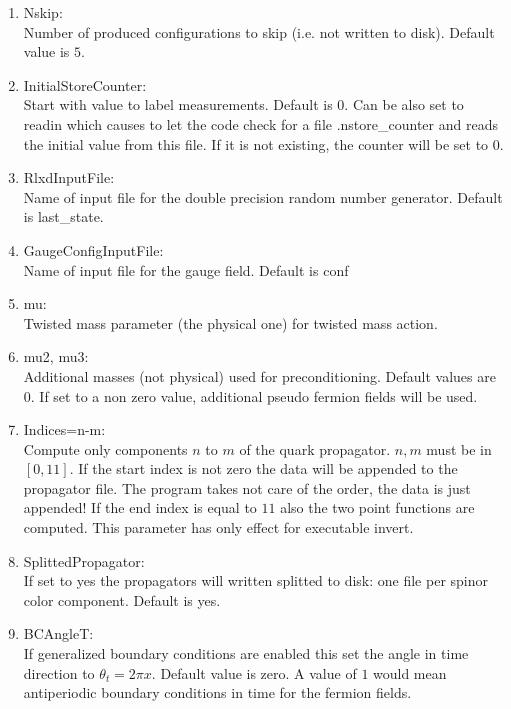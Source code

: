 \begin{enumerate}
\item {\ttfamily Nskip}:\\
  Number of produced configurations to skip (i.e. not written to
  disk). Default value is $5$. 

\item {\ttfamily InitialStoreCounter}:\\
  Start with value to label measurements. Default is $0$. Can be also
  set to {\ttfamily readin} which causes to let the code check for a
  file {\ttfamily .nstore\_counter} and reads the initial value from
  this file. If it is not existing, the counter will be set to $0$.

\item {\ttfamily RlxdInputFile}:\\
  Name of input file for the double precision random number
  generator. Default is {\ttfamily last\_state}.

\item {\ttfamily GaugeConfigInputFile}:\\
  Name of input file for the gauge field. Default is {\ttfamily conf}

\item {\ttfamily mu}:\\
  Twisted mass parameter (the physical one) for twisted mass action.

\item {\ttfamily mu2, mu3}:\\
  Additional masses (not physical) used for preconditioning. Default values are
  $0$. If set to a non zero value, additional pseudo fermion fields
  will be used.

\item {\ttfamily Indices=n-m}:\\
  Compute only components $n$ to $m$ of the quark propagator. $n,m$ must
  be in $[0,11]$. If the start index is not zero the data will be
  appended to the propagator file. The program takes not care of the
  order, the data is just appended! If the end index is equal to $11$
  also the two point functions are computed. This parameter has only
  effect for executable {\ttfamily invert}.

\item {\ttfamily SplittedPropagator}:\\
  If set to yes the propagators will written splitted to disk: one
  file per spinor color component. Default is {\ttfamily yes}.

\item {\ttfamily BCAngleT}:\\
  If generalized boundary conditions are enabled this set the angle in
  time direction to $\theta_t = 2\pi x$. Default value is
  zero. A value of $1$ would mean antiperiodic boundary conditions in
  time for the fermion fields.


\end{enumerate}
